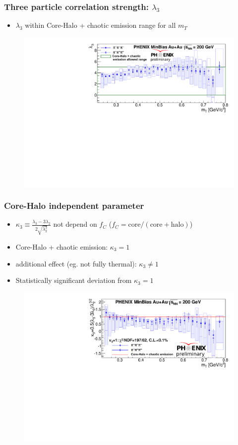 \documentclass{beamer}
\begin{document}
\begin{frame}
\frametitle{Three particle correlation strength: $\lambda_3$}
\begin{itemize}
\setlength{\itemsep}{10pt}
\item $\lambda_3$ within Core-Halo  + chaotic emission range for all $m_T$
\end{itemize}
\begin{figure}
\colorbox{white}{\includegraphics[scale=0.6]{pic/lambda3}}
\end{figure}
\end{frame}



\begin{frame}
\frametitle{Core-Halo independent parameter}
\begin{itemize}
\item $\kappa_3\equiv\frac{\lambda_3-3\lambda_2}{2\sqrt{\lambda_2^3}}$ not depend on $f_C$ ($f_C=\mathrm{core}/(\mathrm{core}+\mathrm{halo})$)
\item Core-Halo + chaotic emission: $\kappa_3=1$
\item additional effect (eg. not fully thermal): $\kappa_3\neq 1$
\item Statistically significant deviation from $\kappa_3=1$
\end{itemize}
\begin{figure}
\includegraphics[scale=0.5]{pic/kappa3}
\end{figure}
\end{frame}
\end{document}
